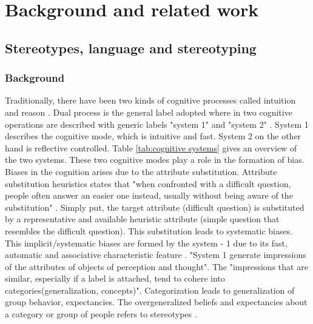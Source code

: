 \chapter{Background and related work}

\section{Stereotypes, language and stereotyping}
\subsection{Background}

Traditionally, there have been two kinds of cognitive processes called intuition and reason \cite{kahneman2002representativeness}. Dual process is the general label adopted where in two cognitive operations are described with generic labels "system 1" and "system 2" \cite{kahneman2002representativeness}. System 1 describes the cognitive mode, which is intuitive and fast. System 2 on the other hand is reflective  controlled. Table \ref{tab:cognitive systems} gives an overview of the two systems. These two cognitive modes play a role in the formation of bias. Biases in the cognition arises due to the attribute substitution. Attribute substitution heuristics states that "when confronted with a difficult question, people often answer an easier one instead, usually
without being aware of the substitution" \cite{kahneman2002representativeness}. Simply put, the target attribute (difficult question) is substituted by a representative and available heuristic attribute (simple question that resembles the difficult question). This substitution leads to systematic biases. This implicit/systematic biases are formed by the system - 1 due to its fast, automatic and associative characteristic feature \cite{kahneman2002representativeness}. "System 1 generate impressions of the attributes of objects of perception and thought"\cite{kahneman2003maps}. The "impressions that are similar, especially if a label is attached, tend to cohere into categories(generalization, concepts)"\cite{fiske1998stereotyping}. Categorization leads to generalization of group behavior, expectancies. The overgeneralized beliefs and expectancies about a category or group of people refers to stereotypes \cite{allport1954nature}\cite{fiske1998stereotyping}. 

